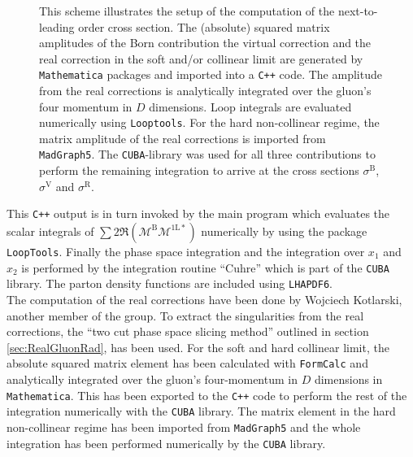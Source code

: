 \begin{figure}[H]
\begin{center}
\caption{This scheme illustrates the setup of the computation of the next-to-leading order cross section. The (absolute) squared matrix amplitudes of the Born contribution the virtual correction and the real correction in the soft and/or collinear limit are generated by \texttt{Mathematica} packages and imported into a \texttt{C++} code. The amplitude from the real corrections is analytically integrated over the gluon's four momentum in $D$ dimensions. Loop integrals are evaluated numerically using \texttt{Looptools}. For the hard non-collinear regime, the matrix amplitude of the real corrections is imported from \texttt{MadGraph5}. The \texttt{CUBA}-library was used for all three contributions to perform the remaining integration to arrive at the cross sections $\sigma^{\mathrm{B}}$, $\sigma^{\mathrm{V}}$ and $\sigma^{\mathrm{R}}$.}\label{fig:CalcSetup}
\end{center}
\end{figure}
This \texttt{C++} output is in turn invoked by the main program which evaluates the scalar integrals of $ \sum 2\Re (\mathcal{M}^{\mathrm{B}} \mathcal{M}^{\mathrm{1L}\ast})$ numerically by using the package \texttt{LoopTools}. Finally the phase space integration and the integration over $x_1$ and $x_2$ is performed by the integration routine ``Cuhre'' which is part of the \texttt{CUBA} library\cite{Hahn:2004fe}. The parton density functions are included using \texttt{LHAPDF6}\cite{Buckley:2014ana}.\\
The computation of the real corrections have been done by Wojciech Kotlarski, another member of the group. To extract the singularities from the real corrections, the ``two cut phase space slicing method'' outlined in section \ref{sec:RealGluonRad}, has been used. For the soft and hard collinear limit, the absolute squared matrix element has been calculated with \texttt{FormCalc} and analytically integrated over the gluon's four-momentum in $D$ dimensions in \texttt{Mathematica}. This has been exported to the \texttt{C++} code to perform the rest of the integration numerically with the \texttt{CUBA} library. The matrix element in the hard non-collinear regime has been imported from \texttt{MadGraph5}\cite{Alwall:2014hca} and the whole integration has been performed numerically by the \texttt{CUBA} library.\\
